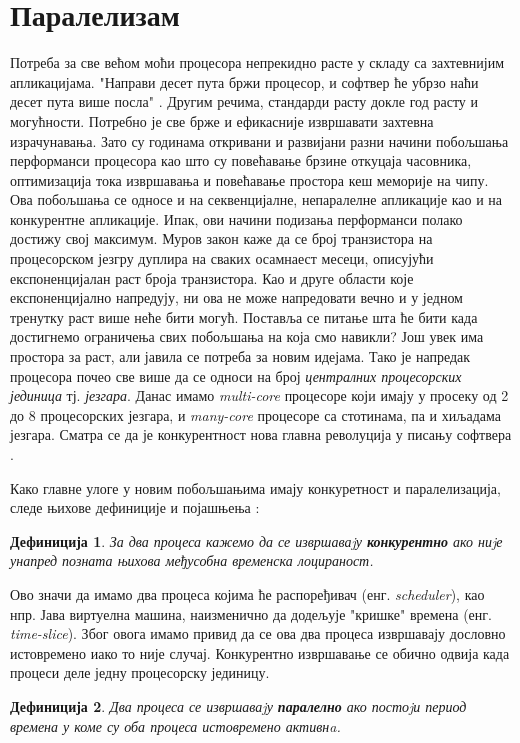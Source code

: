 \documentclass[12pt,oneside]{memoir}
\begin{document}
\section{Паралелизам}
Потреба за све већом моћи процесора непрекидно расте у складу са захтевнијим апликацијама. "Направи десет пута бржи процесор, и софтвер ће убрзо наћи десет пута више посла" \cite{freeLunch}. Другим речима, стандарди расту докле год расту и могућности. Потребно је све брже и ефикасније извршавати захтевна израчунавања. Зато су годинама откривани и развијани разни начини побољшања перформанси процесора као што су повећавање брзине откуцаја часовника, оптимизација тока извршавања и повећавање простора кеш меморије на чипу. Ова побољшања се односе и на секвенцијалне, непаралелне апликације као и на конкурентне апликације. Ипак, ови начини подизања перформанси полако достижу свој максимум. Муров закон каже да се број транзистора на процесорском језгру дуплира на сваких осамнаест месеци, описујући експоненцијалан раст броја транзистора. Као и друге области које експоненцијално напредују, ни ова не може напредовати вечно и у једном тренутку раст више неће бити могућ. Поставља се питање шта ће бити када достигнемо ограничења свих побољшања на која смо навикли? Још увек има простора за раст, али јавила се потреба за новим идејама. Тако је напредак процесора почео све више да се односи на број \textit{централних процесорских јединица} тј. \textit{језгара}. Данас имамо \textit{multi-core} процесоре који имају у просеку од 2 до 8 процесорских језгара, и \textit{many-core} процесоре са стотинама, па и хиљадама језгара. Сматра се да је конкурентност нова главна револуција у писању софтвера \cite{freeLunch, survey}.

Како главне улоге у новим побољшањима имају конкуретност и паралелизација, следе њихове дефиниције и појашњења \cite{survey, konkMalkov, progInScala3}:  
\newtheorem{definition}{Дефиниција}
\begin{definition}
\textit{За два процеса кажемо да се извршаваjу \textbf{конкурентно} ако ниjе унапред позната њихова међусобна временска лоцираност.}
\end{definition}
Ово значи да имамо два процеса којима ће распоређивач (енг. \textit{scheduler}), као нпр. Јава виртуелна машина, наизменично да додељује "кришке" времена (енг. \textit{time-slice}). Због овога имамо привид да се ова два процеса извршавају дословно истовремено иако то није случај. Конкурентно извршавање се обично одвија када процеси деле једну процесорску јединицу.
\begin{definition}
\textit{Два процеса се извршаваjу \textbf{паралелно} ако постоjи период времена у коме су оба процеса истовремено активнa.}
\end{definition}
\end{document}
